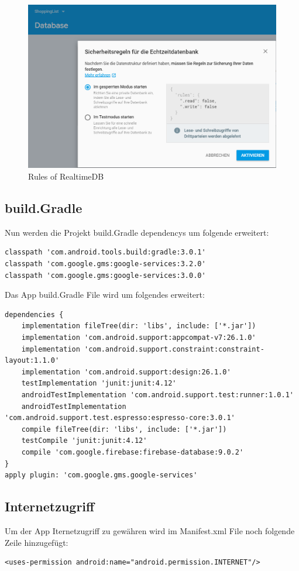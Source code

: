 \begin{figure}[!h]
	\centering
	\includegraphics[width=0.7\linewidth]{images/RealtimeDBrules}
	\caption{Rules of RealtimeDB}
	\label{fig:realtimedbrules}
\end{figure}

\subsection{build.Gradle}
Nun werden die Projekt build.Gradle dependencys um folgende erweitert:
\begin{lstlisting}
classpath 'com.android.tools.build:gradle:3.0.1'
classpath 'com.google.gms:google-services:3.2.0'
classpath 'com.google.gms:google-services:3.0.0'
\end{lstlisting}

Das App build.Gradle File wird um folgendes erweitert:
\begin{lstlisting}
dependencies {
	implementation fileTree(dir: 'libs', include: ['*.jar'])
	implementation 'com.android.support:appcompat-v7:26.1.0'
	implementation 'com.android.support.constraint:constraint-layout:1.1.0'
	implementation 'com.android.support:design:26.1.0'
	testImplementation 'junit:junit:4.12'
	androidTestImplementation 'com.android.support.test:runner:1.0.1'
	androidTestImplementation 'com.android.support.test.espresso:espresso-core:3.0.1'
	compile fileTree(dir: 'libs', include: ['*.jar'])
	testCompile 'junit:junit:4.12'
	compile 'com.google.firebase:firebase-database:9.0.2'
}
apply plugin: 'com.google.gms.google-services'
\end{lstlisting}

\subsection{Internetzugriff}
Um der App Iternetzugriff zu gewähren wird im Manifest.xml File noch folgende Zeile hinzugefügt:
\begin{lstlisting}
<uses-permission android:name="android.permission.INTERNET"/>
\end{lstlisting}

